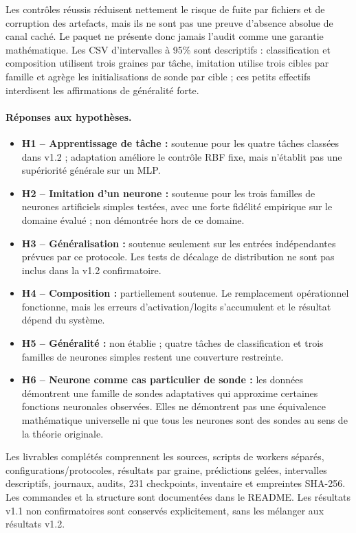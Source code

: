 \documentclass[11pt,a4paper]{article}
\begin{document}
Les contrôles réussis réduisent nettement le risque de fuite par fichiers et de corruption des artefacts, mais ils ne sont pas une preuve d'absence absolue de canal caché. Le paquet ne présente donc jamais l'audit comme une garantie mathématique. Les CSV d'intervalles à 95\% sont descriptifs : classification et composition utilisent trois graines par tâche, imitation utilise trois cibles par famille et agrège les initialisations de sonde par cible ; ces petits effectifs interdisent les affirmations de généralité forte.

\paragraph{Réponses aux hypothèses.}
\begin{itemize}[leftmargin=1.2cm]
\item \textbf{H1 -- Apprentissage de tâche :} soutenue pour les quatre tâches classées dans v1.2 ; adaptation améliore le contrôle RBF fixe, mais n'établit pas une supériorité générale sur un MLP.
\item \textbf{H2 -- Imitation d'un neurone :} soutenue pour les trois familles de neurones artificiels simples testées, avec une forte fidélité empirique sur le domaine évalué ; non démontrée hors de ce domaine.
\item \textbf{H3 -- Généralisation :} soutenue seulement sur les entrées indépendantes prévues par ce protocole. Les tests de décalage de distribution ne sont pas inclus dans la v1.2 confirmatoire.
\item \textbf{H4 -- Composition :} partiellement soutenue. Le remplacement opérationnel fonctionne, mais les erreurs d'activation/logits s'accumulent et le résultat dépend du système.
\item \textbf{H5 -- Généralité :} non établie ; quatre tâches de classification et trois familles de neurones simples restent une couverture restreinte.
\item \textbf{H6 -- Neurone comme cas particulier de sonde :} les données démontrent une famille de sondes adaptatives qui approxime certaines fonctions neuronales observées. Elles ne démontrent pas une équivalence mathématique universelle ni que tous les neurones sont des sondes au sens de la théorie originale.
\end{itemize}

Les livrables complétés comprennent les sources, scripts de workers séparés, configurations/protocoles, résultats par graine, prédictions gelées, intervalles descriptifs, journaux, audits, 231 checkpoints, inventaire et empreintes SHA-256. Les commandes et la structure sont documentées dans le README. Les résultats v1.1 non confirmatoires sont conservés explicitement, sans les mélanger aux résultats v1.2.
\end{document}
